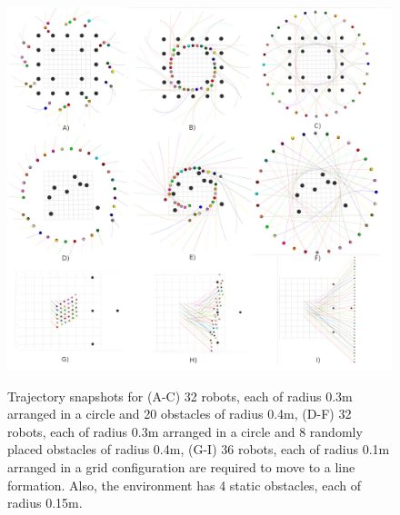 

\begin{figure}
    \centering
    {\includegraphics{figures/gpu_mat/trajectory_snapshots.jpg}} 
    \caption[Multi-robot Trajectory Snapshots]{Trajectory snapshots for (A-C) 32 robots, each of radius 0.3m arranged in a circle and 20 obstacles of radius 0.4m, (D-F) 32 robots, each of radius 0.3m arranged in a circle and 8 randomly placed obstacles of radius 0.4m, (G-I) 36 robots, each of radius 0.1m arranged in a grid configuration are required to move to a line formation. Also, the environment has 4 static obstacles, each of radius 0.15m.}
    \label{figure2}
\end{figure}


